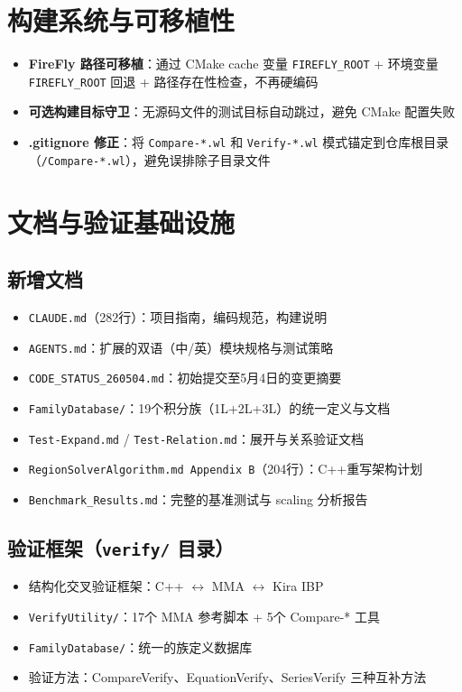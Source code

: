 \documentclass[12pt,a4paper]{article}
\begin{document}
\section{构建系统与可移植性}

\begin{itemize}[nosep]
    \item \textbf{FireFly 路径可移植}：通过 CMake cache 变量 \texttt{FIREFLY\_ROOT} +
    环境变量 \texttt{FIREFLY\_ROOT} 回退 + 路径存在性检查，不再硬编码
    \item \textbf{可选构建目标守卫}：无源码文件的测试目标自动跳过，避免 CMake 配置失败
    \item \textbf{.gitignore 修正}：将 \texttt{Compare-*.wl} 和 \texttt{Verify-*.wl}
    模式锚定到仓库根目录（\texttt{/Compare-*.wl}），避免误排除子目录文件
\end{itemize}

\section{文档与验证基础设施}

\subsection{新增文档}
\begin{itemize}[nosep]
    \item \texttt{CLAUDE.md}（282行）：项目指南，编码规范，构建说明
    \item \texttt{AGENTS.md}：扩展的双语（中/英）模块规格与测试策略
    \item \texttt{CODE\_STATUS\_260504.md}：初始提交至5月4日的变更摘要
    \item \texttt{FamilyDatabase/}：19个积分族（1L+2L+3L）的统一定义与文档
    \item \texttt{Test-Expand.md} / \texttt{Test-Relation.md}：展开与关系验证文档
    \item \texttt{RegionSolverAlgorithm.md Appendix B}（204行）：C++重写架构计划
    \item \texttt{Benchmark\_Results.md}：完整的基准测试与 scaling 分析报告
\end{itemize}

\subsection{验证框架（\texttt{verify/} 目录）}
\begin{itemize}[nosep]
    \item 结构化交叉验证框架：C++ $\leftrightarrow$ MMA $\leftrightarrow$ Kira IBP
    \item \texttt{VerifyUtility/}：17个 MMA 参考脚本 + 5个 Compare-* 工具
    \item \texttt{FamilyDatabase/}：统一的族定义数据库
    \item 验证方法：CompareVerify、EquationVerify、SeriesVerify 三种互补方法
\end{itemize}
\end{document}
